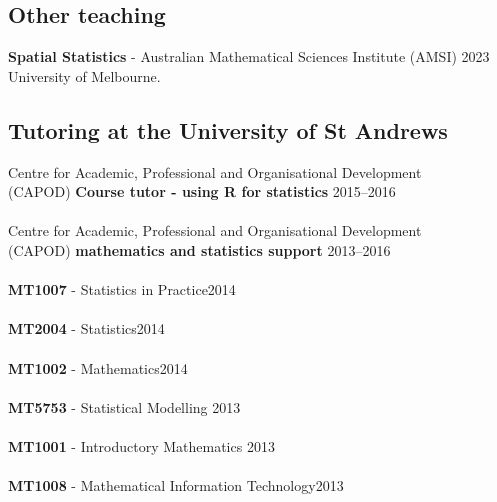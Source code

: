 \documentclass[10pt,letter]{article}
\begin{document}
\vspace{1mm}
 \subsection*{Other teaching}
 \vspace{1mm}

 \textbf{Spatial Statistics} - Australian Mathematical Sciences Institute (AMSI) \hfill{2023} \\
 University of Melbourne.\\
 
\vspace{1mm}
 \subsection*{Tutoring at the University of St Andrews}
 \vspace{1mm}
 
 Centre for Academic, Professional and Organisational Development\\ (CAPOD) \textbf{Course tutor - using R for statistics} \hfill{2015--2016}\\
 \hdashrule[0.5ex]{4cm}{1pt}{1pt}\\
  Centre for Academic, Professional and Organisational Development\\ (CAPOD) \textbf{mathematics and statistics support} \hfill{2013--2016}\\
 \hdashrule[0.5ex]{4cm}{1pt}{1pt}\\
\textbf{MT1007} -  Statistics in Practice\hfill{2014}\\
 \hdashrule[0.5ex]{4cm}{1pt}{1pt}\\
  \textbf{MT2004} -  Statistics\hfill{2014}\\
 \hdashrule[0.5ex]{4cm}{1pt}{1pt}\\
  \textbf{MT1002} -  Mathematics\hfill{2014}\\
 \hdashrule[0.5ex]{4cm}{1pt}{1pt}\\
 \textbf{MT5753} -  Statistical Modelling \hfill{2013}\\
 \hdashrule[0.5ex]{4cm}{1pt}{1pt}\\
\textbf{MT1001} -  Introductory Mathematics \hfill{2013}\\
 \hdashrule[0.5ex]{4cm}{1pt}{1pt}\\
 \textbf{MT1008} -  Mathematical Information Technology\hfill{2013}\\

 \newpage
\end{document}
